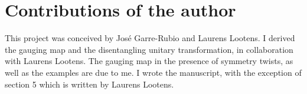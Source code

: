\section{Contributions of the author}
This project was conceived by José Garre-Rubio and Laurens Lootens. I derived the gauging map and the disentangling unitary transformation, in collaboration with Laurens Lootens. The gauging map in the presence of symmetry twists, as well as the examples are due to me. I wrote the manuscript, with the exception of section 5 which is written by Laurens Lootens.
%
